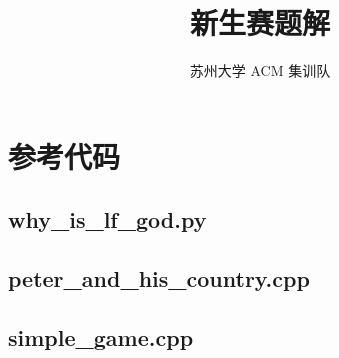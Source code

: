 \documentclass[lang=cn]{elegantpaper}
\title{新生赛题解}
\author{苏州大学 ACM 集训队}
\begin{document}
\isBeamerMode\relax
    \maketitle
    \tableofcontents
\fi

\isBeamerMode\relax
    \frame{\titlepage}
\fi



\def\TOCName{A 题} 
\def\TOCName{B 题} 
\def\TOCName{C 题} 
\def\TOCName{D 题} 
\def\TOCName{E 题} 
\def\TOCName{F 题} 
\def\TOCName{G 题} 
\def\TOCName{H 题} 
\def\TOCName{I 题} 
\def\TOCName{J 题} 


\isBeamerMode\relax
    \section{参考代码}
    \subsection{why\_is\_lf\_god.py}
    

    \subsection{peter\_and\_his\_country.cpp}
    

    \subsection{simple\_game.cpp}
    
\end{document}
